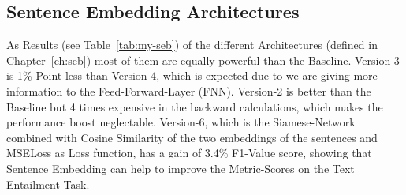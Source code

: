\subsection{Sentence Embedding Architectures}

As Results (see Table~\ref{tab:my-seb}) of the different Architectures (defined in Chapter~\ref{ch:seb})
most of them are equally powerful than the Baseline. Version-3 is 1\% Point less than Version-4, which 
is expected due to we are giving more information to the Feed-Forward-Layer (FNN). Version-2 is better than
the Baseline but 4 times expensive in the backward calculations, which makes the performance boost neglectable.
Version-6, which is the Siamese-Network combined with Cosine Similarity of the two embeddings of the sentences
and MSELoss as Loss function, has a gain of 3.4\% F1-Value score, showing that Sentence Embedding can
help to improve the Metric-Scores on the Text Entailment Task.


